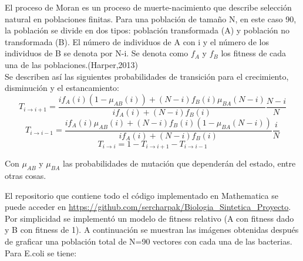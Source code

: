 \documentclass[12pt]{article}
\numberwithin{equation}{section}
\begin{document}
El proceso de Moran es un proceso de muerte-nacimiento que describe selección natural en poblaciones finitas. Para una población de tamaño N, en este caso 90, la población se divide en dos tipos: población transformada (A) y población no transformada (B). El número de individuos de A con i y el número de los individuos de B se denota por N-i. Se denota como $f_A$ y $f_B$ los fitness de cada una de las poblaciones.(Harper,2013)\\
Se describen así las siguientes probabilidades de transición para el crecimiento, disminución y el estancamiento:
\[ T_{i \rightarrow i+1}= \frac{i f_{A} \left(i\right) \left( 1 - \mu_{AB} \left(i\right) \right) + \left( N-i \right) f_{B} \left(i\right) \mu_{BA} \left(N-i\right) }{i f_{A}\left(i\right)+ \left(N-i\right) f_{B}\left(i\right)} \frac{N-i}{N}\]
\[ T_{i \rightarrow i-1}= \frac{i f_{A} \left(i\right) \mu_{AB} \left(i\right) + \left( N-i \right) f_{B} \left(i\right)\left(1- \mu_{BA} \left(N-i\right) \right) }{i f_{A}\left(i\right)+ \left(N-i\right) f_{B}\left(i\right)} \frac{i}{N}\]
\[ T_{i \rightarrow i}= 1 - T_{i \rightarrow i+1} - T_{i \rightarrow i-1} \]

Con $\mu_{AB}$ y $\mu_{BA}$ las probabilidades de mutación que dependerán del estado, entre otras cosas.

El repositorio que contiene todo el código implementado en Mathematica se puede acceder en \url{https://github.com/sercharpak/Biologia_Sintetica_Proyecto}. Por simplicidad se implementó un modelo de fitness relativo (A con fitness dado y B con fitness de 1). A continuación se muestran las imágenes obtenidas después de graficar una población total de N=90 vectores con cada una de las bacterias.\\
Para E.coli se tiene:\\
\end{document}
